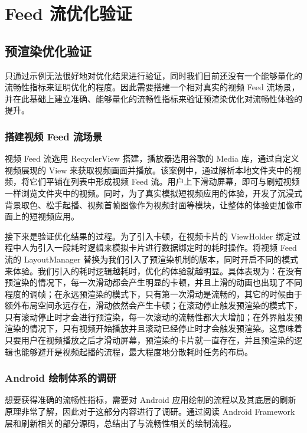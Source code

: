 \chapter{Feed 流优化验证}

\section{预渲染优化验证}

只通过示例无法很好地对优化结果进行验证，同时我们目前还没有一个能够量化的流畅性指标来证明优化的程度。因此需要搭建一个相对真实的视频 Feed 流场景，并在此基础上建立准确、能够量化的流畅性指标来验证预渲染优化对流畅性体验的提升。

\subsection{搭建视频 Feed 流场景}

视频 Feed 流选用 RecyclerView 搭建，播放器选用谷歌的 Media 库，通过自定义视频展现的 View 来获取视频画面并播放。该案例中，通过解析本地文件夹中的视频，将它们平铺在列表中形成视频 Feed 流。用户上下滑动屏幕，即可与刷短视频一样浏览文件夹中的视频。同时，为了真实模拟短视频应用的体验，开发了沉浸式背景取色、松手起播、视频首帧图像作为视频封面等模块，让整体的体验更加像市面上的短视频应用。

接下来是验证优化结果的过程。为了引入卡顿，在视频卡片的 ViewHolder 绑定过程中人为引入一段耗时逻辑来模拟卡片进行数据绑定时的耗时操作。将视频 Feed 流的 LayoutManager 替换为我们引入了预渲染机制的版本，同时开启不同的模式来体验。我们引入的耗时逻辑越耗时，优化的体验就越明显。具体表现为：在没有预渲染的情况下，每一次滑动都会产生明显的卡顿，并且上滑的动画也出现了不同程度的调帧；在永远预渲染的模式下，只有第一次滑动是流畅的，其它的时候由于额外布局空间永远存在，滑动依然会产生卡顿；在滚动停止触发预渲染的模式下，只有滚动停止时才会进行预渲染，每一次滚动的流畅性都大大增加；在外界触发预渲染的情况下，只有视频开始播放并且滚动已经停止时才会触发预渲染。这意味着只要用户在视频播放之后才滑动屏幕，预渲染的卡片就一直存在，并且预渲染的逻辑也能够避开是视频起播的流程，最大程度地分散耗时任务的布局。

\subsection{Android 绘制体系的调研}

想要获得准确的流畅性指标，需要对 Android 应用绘制的流程以及其底层的刷新原理非常了解，因此对于这部分内容进行了调研。通过阅读 Android Framework 层和刷新相关的部分源码，总结出了与流畅性相关的绘制流程。

